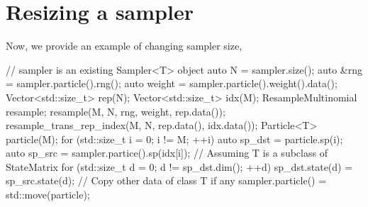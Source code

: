 \section{Resizing a sampler}
\label{sec:Resizing a sampler}

Now, we provide an example of changing sampler size,
\begin{cppcode}
  // sampler is an existing Sampler<T> object
  auto N = sampler.size();
  auto &rng = sampler.particle().rng();
  auto weight = sampler.particle().weight().data();
  Vector<std::size_t> rep(N);
  Vector<std::size_t> idx(M);
  ResampleMultinomial resample;
  resample(M, N, rng, weight, rep.data());
  resample_trans_rep_index(M, N, rep.data(), idx.data());
  Particle<T> particle(M);
  for (std::size_t i = 0; i != M; ++i) {
      auto sp_dst = particle.sp(i);
      auto sp_src = sampler.partice().sp(idx[i]);
      // Assuming T is a subclass of StateMatrix
      for (std::size_t d = 0; d != sp_dst.dim(); ++d)
      sp_dst.state(d) = sp_src.state(d);
  }
  // Copy other data of class T if any
  sampler.particle() = std::move(particle);
\end{cppcode}
